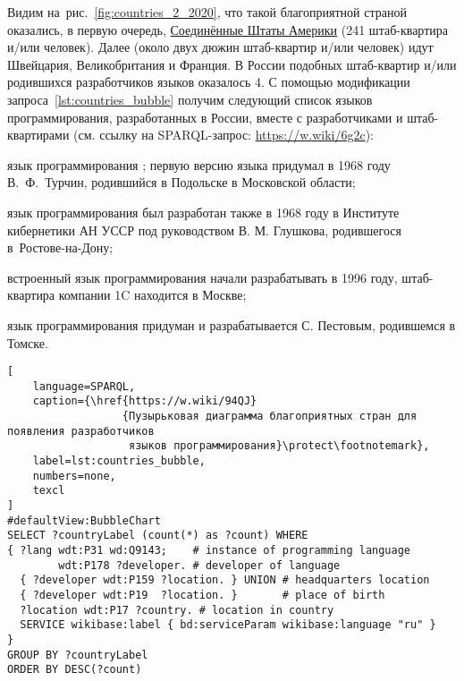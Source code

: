 Видим на~рис.~\ref{fig:countries_2_2020}, 
что такой благоприятной страной оказались, в первую очередь, 
\href{https://en.wikipedia.org/wiki/USA}{Соединённые Штаты Америки} (241 штаб-квартира и/или человек). 
Далее (около двух дюжин штаб-квартир и/или человек) идут 
Швейцария, Великобритания и Франция.  
В России подобных штаб-квартир и/или родившихся разработчиков языков оказалось 4. 
С помощью модификации запроса~\ref{lst:countries_bubble} получим 
следующий список языков программирования, разработанных в России, 
вместе с разработчиками и штаб-квартирами 
(см. ссылку на SPARQL-запрос: \href{https://w.wiki/6g2c}{https://w.wiki/6g2c}):
\begin{compactitemize}
	\item язык программирования ;  
        первую версию языка придумал в 1968 году В.~Ф.~Турчин, 
        родившийся в Подольске в Московской области; 

    \item язык программирования  
        был разработан также в 1968 году в Институте кибернетики АН УССР 
        под руководством В. М. Глушкова, родившегося в~Ростове-на-Дону;

	\item встроенный язык программирования  начали разрабатывать в 1996 году, 
        штаб-квартира компании 1C находится в Москве; 

    \item язык программирования 
        придуман и разрабатывается С. Пестовым, родившемся в Томске.
\end{compactitemize}



\begin{lstlisting}[
	language=SPARQL,
	caption={\href{https://w.wiki/94QJ}
                  {Пузырьковая диаграмма благоприятных стран для появления разработчиков 
                   языков программирования}\protect\footnotemark},
	label=lst:countries_bubble,
    numbers=none,
	texcl
]
#defaultView:BubbleChart
SELECT ?countryLabel (count(*) as ?count) WHERE 
{ ?lang wdt:P31 wd:Q9143;    # instance of programming language
        wdt:P178 ?developer. # developer of language
  { ?developer wdt:P159 ?location. } UNION # headquarters location
  { ?developer wdt:P19  ?location. }       # place of birth
  ?location wdt:P17 ?country. # location in country
  SERVICE wikibase:label { bd:serviceParam wikibase:language "ru" } 	
}
GROUP BY ?countryLabel
ORDER BY DESC(?count)
\end{lstlisting}






